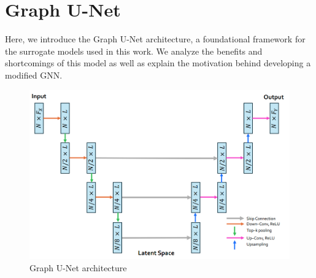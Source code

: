 \section{Graph U-Net}
Here, we introduce the Graph U-Net architecture, a foundational framework for the surrogate models used in this work. We analyze the benefits and shortcomings of this model as well as explain the motivation behind developing a modified GNN.
\begin{figure}[ht]
    \centering
    \includegraphics[width=12cm]{images/Methodology/GraphUNet.png}
    \caption{Graph U-Net architecture}
    \label{fig:GraphUnet}
\end{figure}
